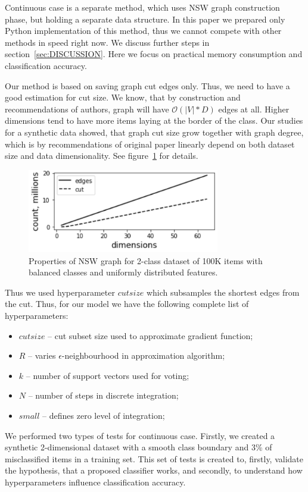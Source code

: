 Continuous case is a separate method, which uses NSW graph construction phase, but holding a separate data structure. In this paper we prepared only Python implementation of this method, thus we cannot compete with other methods in speed right now. We discuss further steps in section~\ref{sec:DISCUSSION}. Here we focus on practical memory consumption and classification accuracy.

Our method is based on saving graph cut edges only. Thus, we need to have a good estimation for cut size. We know, that by construction and recommendations of authors, graph will have $\mathcal{O}(|V|*D)$ edges at all. Higher dimensions tend to have more items laying at the border of the class. Our studies for a synthetic data showed, that graph cut size grow together with graph degree, which is by recommendations of original paper linearly depend on both dataset size and data dimensionality. See figure~\ref{fig:nswcutsize} for details.

\begin{figure}
    \includegraphics[width=3.3in]{paper/images/02_cutsize.png}
    \caption{Properties of NSW graph for 2-class dataset of 100K items with balanced classes and uniformly distributed features.}
    \label{fig:nswcutsize}
\end{figure}

Thus we used hyperparameter $cutsize$ which subsamples the shortest edges from the cut. Thus, for our model we have the following complete list of hyperparameters:
\begin{itemize}
    \item $cutsize$ -- cut subset size used to approximate gradient function;
    \item $R$ -- varies $\epsilon$-neighbourhood in approximation algorithm;
    \item $k$ -- number of support vectors used for voting;
    \item $N$ -- number of steps in discrete integration;
    \item $small$ -- defines zero level of integration;
\end{itemize}


We performed two types of tests for continuous case. Firstly, we created a synthetic 2-dimensional dataset with a smooth class boundary and 3\% of misclassified items in a training set. This set of tests is created to, firstly, validate the hypothesis, that a proposed classifier works, and secondly, to understand how hyperparameters influence classification accuracy.





